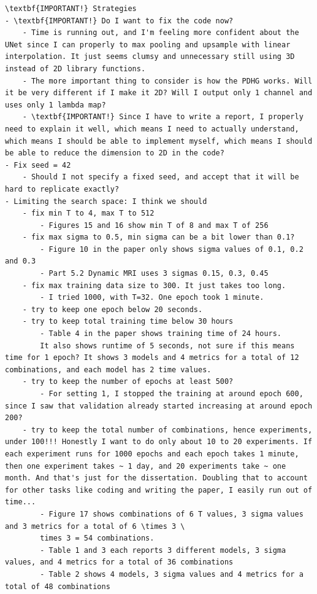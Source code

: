 \documentclass[12pt]{article}
\begin{document}
\begin{verbatim}
\textbf{IMPORTANT!} Strategies
- \textbf{IMPORTANT!} Do I want to fix the code now?
    - Time is running out, and I'm feeling more confident about the UNet since I can properly to max pooling and upsample with linear interpolation. It just seems clumsy and unnecessary still using 3D instead of 2D library functions.
    - The more important thing to consider is how the PDHG works. Will it be very different if I make it 2D? Will I output only 1 channel and uses only 1 lambda map?
    - \textbf{IMPORTANT!} Since I have to write a report, I properly need to explain it well, which means I need to actually understand, which means I should be able to implement myself, which means I should be able to reduce the dimension to 2D in the code?
- Fix seed = 42
    - Should I not specify a fixed seed, and accept that it will be hard to replicate exactly?
- Limiting the search space: I think we should 
    - fix min T to 4, max T to 512
        - Figures 15 and 16 show min T of 8 and max T of 256
    - fix max sigma to 0.5, min sigma can be a bit lower than 0.1?
        - Figure 10 in the paper only shows sigma values of 0.1, 0.2 and 0.3
        - Part 5.2 Dynamic MRI uses 3 sigmas 0.15, 0.3, 0.45
    - fix max training data size to 300. It just takes too long.
        - I tried 1000, with T=32. One epoch took 1 minute.
    - try to keep one epoch below 20 seconds.
    - try to keep total training time below 30 hours
        - Table 4 in the paper shows training time of 24 hours.
        It also shows runtime of 5 seconds, not sure if this means time for 1 epoch? It shows 3 models and 4 metrics for a total of 12 combinations, and each model has 2 time values. 
    - try to keep the number of epochs at least 500?
        - For setting 1, I stopped the training at around epoch 600, since I saw that validation already started increasing at around epoch 200?
    - try to keep the total number of combinations, hence experiments, under 100!!! Honestly I want to do only about 10 to 20 experiments. If each experiment runs for 1000 epochs and each epoch takes 1 minute, then one experiment takes ~ 1 day, and 20 experiments take ~ one month. And that's just for the dissertation. Doubling that to account for other tasks like coding and writing the paper, I easily run out of time... 
        - Figure 17 shows combinations of 6 T values, 3 sigma values and 3 metrics for a total of 6 \times 3 \
        times 3 = 54 combinations.
        - Table 1 and 3 each reports 3 different models, 3 sigma values, and 4 metrics for a total of 36 combinations
        - Table 2 shows 4 models, 3 sigma values and 4 metrics for a total of 48 combinations

\end{verbatim}
\end{document}
